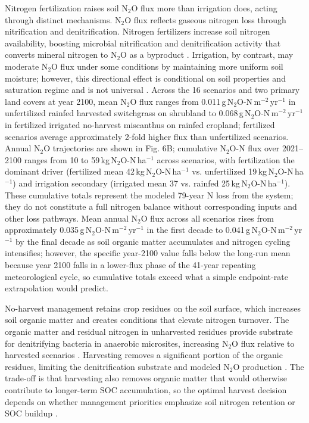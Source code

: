 \documentclass[11pt]{article}
\begin{document}
Nitrogen fertilization raises soil N$_2$O flux more than irrigation does, acting through distinct mechanisms. N$_2$O flux reflects gaseous nitrogen loss through nitrification and denitrification. Nitrogen fertilizers increase soil nitrogen availability, boosting microbial nitrification and denitrification activity that converts mineral nitrogen to N$_2$O as a byproduct \citep{Bouwman1996Placeholder,Bouwman2002Placeholder,ButterbachBahl2013Placeholder,LiuGreaver2009Placeholder}. Irrigation, by contrast, may moderate N$_2$O flux under some conditions by maintaining more uniform soil moisture; however, this directional effect is conditional on soil properties and saturation regime and is not universal \citep{Groffman2009Placeholder,Zhu2013Placeholder}. Across the 16 scenarios and two primary land covers at year 2100, mean N$_2$O flux ranges from 0.011\,g\,N$_2$O-N\,m$^{-2}$\,yr$^{-1}$ in unfertilized rainfed harvested switchgrass on shrubland to 0.068\,g\,N$_2$O-N\,m$^{-2}$\,yr$^{-1}$ in fertilized irrigated no-harvest miscanthus on rainfed cropland; fertilized scenarios average approximately 2-fold higher flux than unfertilized scenarios. Annual N$_2$O trajectories are shown in Fig. 6B; cumulative N$_2$O-N flux over 2021--2100 ranges from 10 to 59\,kg\,N$_2$O-N\,ha$^{-1}$ across scenarios, with fertilization the dominant driver (fertilized mean 42\,kg\,N$_2$O-N\,ha$^{-1}$ vs. unfertilized 19\,kg\,N$_2$O-N\,ha$^{-1}$) and irrigation secondary (irrigated mean 37 vs. rainfed 25\,kg\,N$_2$O-N\,ha$^{-1}$). These cumulative totals represent the modeled 79-year N loss from the system; they do not constitute a full nitrogen balance without corresponding inputs and other loss pathways. Mean annual N$_2$O flux across all scenarios rises from approximately 0.035\,g\,N$_2$O-N\,m$^{-2}$\,yr$^{-1}$ in the first decade to 0.041\,g\,N$_2$O-N\,m$^{-2}$\,yr$^{-1}$ by the final decade as soil organic matter accumulates and nitrogen cycling intensifies; however, the specific year-2100 value falls below the long-run mean because year 2100 falls in a lower-flux phase of the 41-year repeating meteorological cycle, so cumulative totals exceed what a simple endpoint-rate extrapolation would predict.

No-harvest management retains crop residues on the soil surface, which increases soil organic matter and creates conditions that elevate nitrogen turnover. The organic matter and residual nitrogen in unharvested residues provide substrate for denitrifying bacteria in anaerobic microsites, increasing N$_2$O flux relative to harvested scenarios \citep{Smith2008GHGMitigation,Miller2008SoilBio}. Harvesting removes a significant portion of the organic residues, limiting the denitrification substrate and modeled N$_2$O production \citep{ButterbachBahl2013Placeholder}. The trade-off is that harvesting also removes organic matter that would otherwise contribute to longer-term SOC accumulation, so the optimal harvest decision depends on whether management priorities emphasize soil nitrogen retention or SOC buildup \citep{Lal2004bClimateChange,Johnson2007BiomassCropping}.
\end{document}
